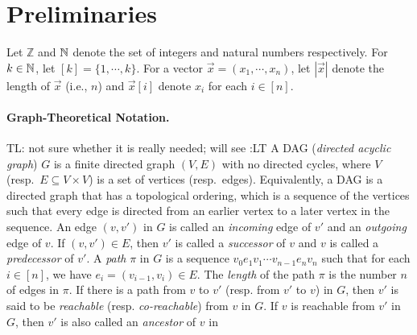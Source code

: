 \documentclass{llncs}
\newcommand{\tl}[1]{\color{blue} {TL: #1 :LT} \color{black}}
\newcommand{\tl}[1]{}
\begin{document}

\section{Preliminaries}

Let $\mathbb{Z}$ and $\mathbb{N}$ denote the set of integers and natural numbers respectively. For $k \in \mathbb{N}$, let $[k] = \{1,\cdots, k\}$. For a vector $\vec{x}=(x_1,\cdots, x_n)$, let $|\vec{x}|$ denote the length of $\vec{x}$ (i.e., $n$) and  $\vec{x}[i]$ denote $x_i$ for each $i \in [n]$.

\paragraph{Graph-Theoretical Notation.} \tl{not sure whether it is really needed; will see}
A DAG (\emph{directed acyclic graph}) $G$ is a finite directed graph $(V, E)$ with
no directed cycles, where $V$ (resp.~$E \subseteq V \times V$) is a set of vertices (resp.~edges).
Equivalently, a DAG is a directed graph that has a topological ordering, which
is a sequence of the vertices such that every edge is directed from an earlier
vertex to a later vertex in the sequence. An edge $(\mathit{v},\mathit{v'})$ in
$G$ is called an \emph{incoming} edge of $\mathit{v'}$ and an \emph{outgoing}
edge of $\mathit{v}$. If $(\mathit{v},\mathit{v'}) \in E$, then $\mathit{v'}$ is
called a \emph{successor} of $\mathit{v}$ and $\mathit{v}$ is called a
\emph{predecessor} of $\mathit{v'}$. A \emph{path} $\pi$ in $G$ is a sequence
$\mathit{v}_0 \mathit{e}_1 \mathit{v}_1 \cdots \mathit{v}_{n-1} \mathit{e}_n
\mathit{v}_n$ such that for each $i \in [n]$, we have $\mathit{e}_i =
(\mathit{v}_{i-1},\mathit{v}_i) \in E$. The \emph{length} of the path $\pi$
is the number $n$ of edges in $\pi$. If there is a path from
$\mathit{v}$ to $\mathit{v'}$ (resp. from $\mathit{v'}$ to $\mathit{v}$) in $G$,
then $\mathit{v'}$ is said to be \emph{reachable} (resp. \emph{co-reachable})
from $\mathit{v}$ in $G$. If $\mathit{v}$ is reachable from $\mathit{v'}$ in
$G$, then $\mathit{v'}$ is also called an \emph{ancestor} of $\mathit{v}$ in
\end{document}
